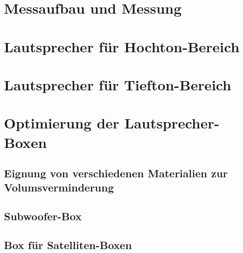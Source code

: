 \newpage
\section{Messaufbau und Messung}


\section{Lautsprecher für Hochton-Bereich}


\section{Lautsprecher für Tiefton-Bereich}


\section{Optimierung der Lautsprecher-Boxen}

\subsection{Eignung von verschiedenen Materialien zur Volumsverminderung}

\subsection{Subwoofer-Box}

\subsection{Box für Satelliten-Boxen}